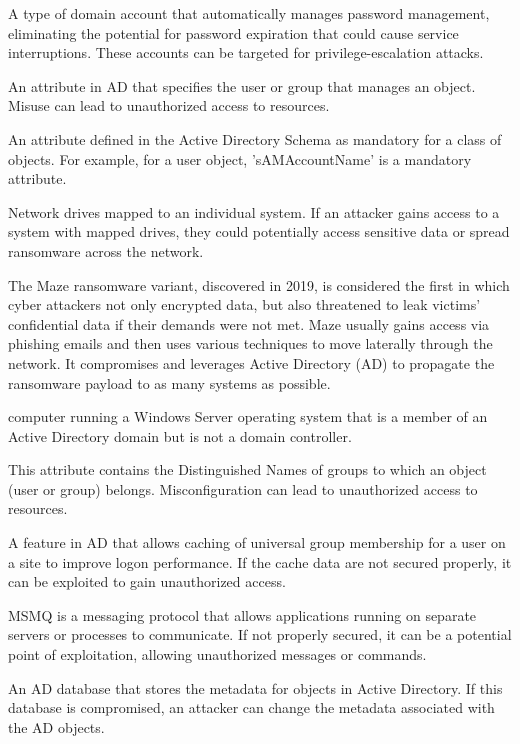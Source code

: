  A type of domain account that automatically manages password management, eliminating the potential for password expiration that could cause service interruptions. These accounts can be targeted for privilege-escalation attacks.

 An attribute in AD that specifies the user or group that manages an object. Misuse can lead to unauthorized access to resources.

 An attribute defined in the Active Directory Schema as mandatory for a class of objects. For example, for a user object, 'sAMAccountName' is a mandatory attribute.

 Network drives mapped to an individual system. If an attacker gains access to a system with mapped drives, they could potentially access sensitive data or spread ransomware across the network.

 The Maze ransomware variant, discovered in 2019, is considered the first in which cyber attackers not only encrypted data, but also threatened to leak victims’ confidential data if their demands were not met. Maze usually gains access via phishing emails and then uses various techniques to move laterally through the network. It compromises and leverages Active Directory (AD) to propagate the ransomware payload to as many systems as possible.

 computer running a Windows Server operating system that is a member of an Active Directory domain but is not a domain controller.

 This attribute contains the Distinguished Names of groups to which an object (user or group) belongs. Misconfiguration can lead to unauthorized access to resources.

 A feature in AD that allows caching of universal group membership for a user on a site to improve logon performance. If the cache data are not secured properly, it can be exploited to gain unauthorized access.

 MSMQ is a messaging protocol that allows applications running on separate servers or processes to communicate. If not properly secured, it can be a potential point of exploitation, allowing unauthorized messages or commands.

 An AD database that stores the metadata for objects in Active Directory. If this database is compromised, an attacker can change the metadata associated with the AD objects.

